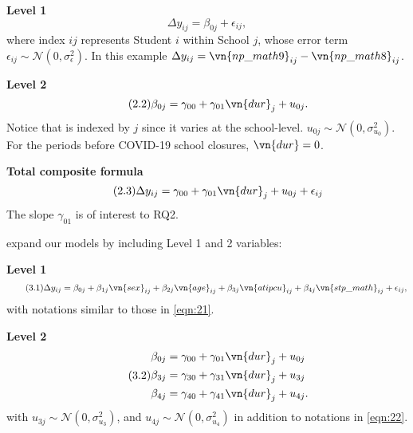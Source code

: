 \noindent\textbf{Level 1}
\begin{equation}\label{eqn:21}\tag{2.1}
    \Delta y_{ij} = \beta_{0j} + \epsilon_{ij},
\end{equation}
where index $ij$ represents Student $i$ within School $j$, whose error term $\epsilon_{ij} \sim \mathcal{N}(0, \sigma_\epsilon^2)$. In this example
$\Delta y_{ij} = \vn{np\_math9}_{ij} - \vn{np\_math8}_{ij}$.

\noindent\textbf{Level 2}
\begin{equation}\label{eqn:22}\tag{2.2}
    \beta_{0j} = \gamma_{00} + \gamma_{01} \vn{dur}_j + u_{0j}.
\end{equation}
Notice that  is indexed by $j$ since it varies at the school-level. $u_{0j} \sim \mathcal{N}(0, \sigma_{u_0}^2)$. For the periods before COVID-19 school closures, $\vn{dur} = 0$.

\noindent\textbf{Total composite formula}
\begin{equation}\label{eqn:23}\tag{2.3}
    \Delta y_{ij} = \gamma_{00} + \gamma_{01} \vn{dur}_j+ u_{0j} + \epsilon_{ij}
\end{equation}
The slope $\gamma_{01}$ is of interest to RQ2.

 expand our models by including Level 1 and 2 variables:

\noindent\textbf{Level 1}
\begin{equation}\label{eqn:31}\tag{3.1}
    \Delta y_{ij} = \beta_{0j} + \beta_{1j} \vn{sex}_{ij} + \beta_{2j} \vn{age}_{ij} + \beta_{3j} \vn{atipcu}_{ij} + \beta_{4j} \vn{stp\_math}_{ij} + \epsilon_{ij},
\end{equation}
with notations similar to those in \cref{eqn:21}.

\noindent\textbf{Level 2}
\begin{equation}\label{eqn:32}\tag{3.2}
    \begin{aligned}
    \beta_{0j} &= \gamma_{00} + \gamma_{01} \vn{dur}_j + u_{0j}\\
    \beta_{3j} &= \gamma_{30} + \gamma_{31} \vn{dur}_j + u_{3j}\\
    \beta_{4j} &= \gamma_{40} + \gamma_{41} \vn{dur}_j + u_{4j}.
    \end{aligned}
\end{equation}
with $u_{3j} \sim \mathcal{N}(0, \sigma_{u_3}^2)$, and $u_{4j} \sim \mathcal{N}(0, \sigma_{u_4}^2)$ in addition to notations in \cref{eqn:22}.

